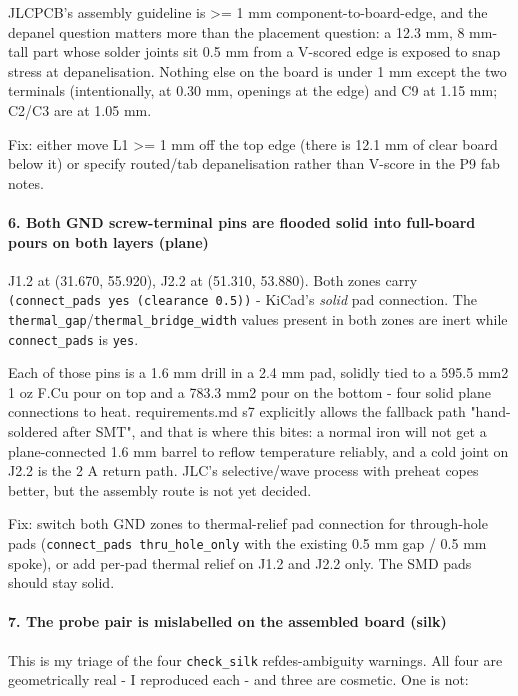 \documentclass[11pt,a4paper]{article}
\begin{document}
JLCPCB's assembly guideline is \textgreater{}= 1 mm component-to-board-edge, and the depanel question matters more than the placement question: a 12.3 mm, 8 mm-tall part whose solder joints sit 0.5 mm from a V-scored edge is exposed to snap stress at depanelisation. Nothing else on the board is under 1 mm except the two terminals (intentionally, at 0.30 mm, openings at the edge) and C9 at 1.15 mm; C2/C3 are at 1.05 mm.

Fix: either move L1 \textgreater{}= 1 mm off the top edge (there is 12.1 mm of clear board below it) or specify routed/tab depanelisation rather than V-score in the P9 fab notes.

\paragraph*{6. Both GND screw-terminal pins are flooded solid into full-board pours on both layers (plane)}
J1.2 at (31.670, 55.920), J2.2 at (51.310, 53.880). Both zones carry \texttt{(connect\_pads yes (clearance 0.5))} - KiCad's \emph{solid} pad connection. The \texttt{thermal\_gap}/\texttt{thermal\_bridge\_width} values present in both zones are inert while \texttt{connect\_pads} is \texttt{yes}.

Each of those pins is a 1.6 mm drill in a 2.4 mm pad, solidly tied to a 595.5 mm2 1 oz F.Cu pour on top and a 783.3 mm2 pour on the bottom - four solid plane connections to heat. requirements.md s7 explicitly allows the fallback path "hand-soldered after SMT", and that is where this bites: a normal iron will not get a plane-connected 1.6 mm barrel to reflow temperature reliably, and a cold joint on J2.2 is the 2 A return path. JLC's selective/wave process with preheat copes better, but the assembly route is not yet decided.

Fix: switch both GND zones to thermal-relief pad connection for through-hole pads (\texttt{connect\_pads thru\_hole\_only} with the existing 0.5 mm gap / 0.5 mm spoke), or add per-pad thermal relief on J1.2 and J2.2 only. The SMD pads should stay solid.

\paragraph*{7. The probe pair is mislabelled on the assembled board (silk)}
This is my triage of the four \texttt{check\_silk} refdes-ambiguity warnings. All four are geometrically real - I reproduced each - and three are cosmetic. One is not:
\end{document}
